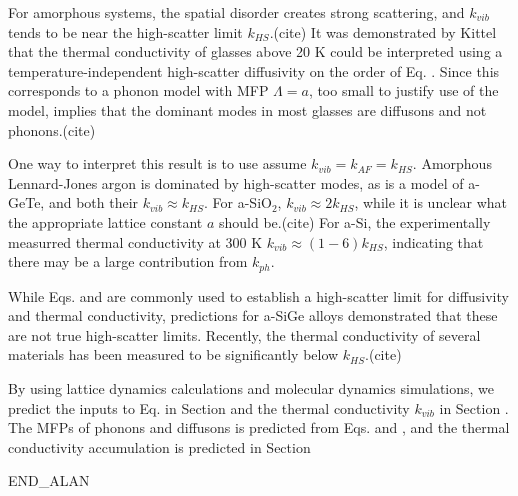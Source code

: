 \documentclass[aps,prb,twocolumn,superscriptaddress,footinbib,amsmath,amssymb,floatfix]{revtex4}
\begin{document}
For amorphous systems, the 
spatial disorder creates strong scattering, and $k_{vib}$ tends to be 
near the high-scatter limit $k_{HS}$.(cite) 
It was demonstrated by Kittel that  
the thermal conductivity of glasses above 20 K could be interpreted 
using a temperature-independent high-scatter diffusivity on the order 
of Eq. .  
Since this corresponds to a phonon model with MFP $\Lambda = a$, 
too small to justify use of the model, implies that the dominant 
modes in most glasses are diffusons and not phonons.(cite)  

One way to interpret this result is to use assume 
$k_{vib} = k_{AF} = k_{HS}$. Amorphous Lennard-Jones argon is dominated 
by high-scatter modes,\cite{larkin_predicting_2013} as is a model of 
a-GeTe, and both their $k_{vib} \approx k_{HS}$.\cite{sosso_thermal_2012} 
For a-SiO$_2$, $k_{vib} \approx 2k_{HS}$, while it is unclear what the 
appropriate lattice constant $a$ should be.(cite)   
For a-Si, the experimentally measurred thermal conductivity at 
300 K $k_{vib} \approx (1-6) k_{HS}$,\cite{cahill_lower_1992}  
indicating that there may be a large contribution from $k_{ph}$.

While Eqs. and are commonly used to establish a high-scatter limit for 
diffusivity and thermal conductivity, predictions for a-SiGe alloys 
demonstrated that these are not true high-scatter limits.
\cite{feldman_thermal_1993} Recently, the thermal conductivity 
of several materials has been measured to be significantly below 
$k_{HS}$.(cite) 

By using lattice dynamics calculations and molecular dynamics simulations, 
we predict the inputs to Eq. in Section and the 
thermal conductivity $k_{vib}$ in Section . The MFPs of phonons and 
diffusons is predicted from Eqs. and , and the thermal conductivity 
accumulation is predicted in Section 

END_ALAN

\end{document}
